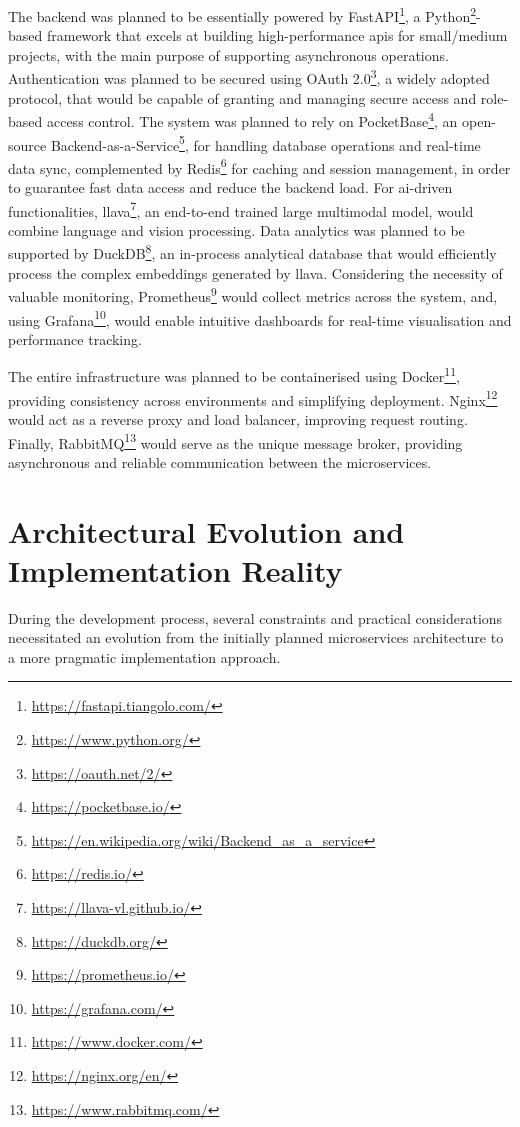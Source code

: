 The backend was planned to be essentially powered by FastAPI\footnote{\url{https://fastapi.tiangolo.com/}}, a Python\footnote{\url{https://www.python.org/}}-based framework that excels at building high-performance \acp{api} for small/medium projects, with the main purpose of supporting asynchronous operations. Authentication was planned to be secured using OAuth 2.0\footnote{\url{https://oauth.net/2/}}, a widely adopted protocol, that would be capable of granting and managing secure access and role-based access control. The system was planned to rely on PocketBase\footnote{\url{https://pocketbase.io/}}, an open-source Backend-as-a-Service\footnote{\url{https://en.wikipedia.org/wiki/Backend_as_a_service}}, for handling database operations and real-time data sync, complemented by Redis\footnote{\url{https://redis.io/}} for caching and session management, in order to guarantee fast data access and reduce the backend load. For \ac{ai}-driven functionalities, \ac{llava}\footnote{\url{https://llava-vl.github.io/}}, an end-to-end trained large multimodal model, would combine language and vision processing. Data analytics was planned to be supported by DuckDB\footnote{\url{https://duckdb.org/}}, an in-process analytical database that would efficiently process the complex embeddings generated by \ac{llava}. Considering the necessity of valuable monitoring, Prometheus\footnote{\url{https://prometheus.io/}} would collect metrics across the system, and, using Grafana\footnote{\url{https://grafana.com/}}, would enable intuitive dashboards for real-time visualisation and performance tracking. 

The entire infrastructure was planned to be containerised using Docker\footnote{\url{https://www.docker.com/}}, providing consistency across environments and simplifying deployment. Nginx\footnote{\url{https://nginx.org/en/}} would act as a reverse proxy and load balancer, improving request routing. Finally, RabbitMQ\footnote{\url{https://www.rabbitmq.com/}} would serve as the unique message broker, providing asynchronous and reliable communication between the microservices.


\section{Architectural Evolution and Implementation Reality} \label{section:architectural_evolution}

During the development process, several constraints and practical considerations necessitated an evolution from the initially planned microservices architecture to a more pragmatic implementation approach.

